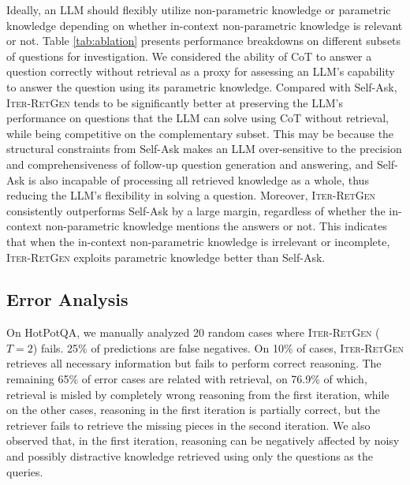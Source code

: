 \documentclass[11pt]{article}
\begin{document}
Ideally, an LLM should flexibly utilize non-parametric knowledge or parametric knowledge depending on whether in-context non-parametric knowledge is relevant or not.
Table \ref{tab:ablation} presents performance breakdowns on different subsets of questions for investigation.
We considered the ability of CoT to answer a question correctly without retrieval as a proxy for assessing an LLM's capability to answer the question using its parametric knowledge.
Compared with Self-Ask, I\textsc{ter}-R\textsc{et}G\textsc{en} tends to be significantly better at preserving the LLM's performance on questions that the LLM can solve using CoT without retrieval, while being competitive on the complementary subset.
This may be because the structural constraints from Self-Ask makes an LLM over-sensitive to the precision and comprehensiveness of follow-up question generation and answering, and Self-Ask is also incapable of processing all retrieved knowledge as a whole, thus reducing the LLM's flexibility in solving a question.
Moreover, I\textsc{ter}-R\textsc{et}G\textsc{en} consistently outperforms Self-Ask by a large margin, regardless of whether the in-context non-parametric knowledge mentions the answers or not.
This indicates that when the in-context non-parametric knowledge is irrelevant or incomplete, I\textsc{ter}-R\textsc{et}G\textsc{en} exploits parametric knowledge better than Self-Ask.

\subsection{Error Analysis}
On HotPotQA, we manually analyzed 20 random cases where I\textsc{ter}-R\textsc{et}G\textsc{en} ($T=2$) fails.
25\% of predictions are false negatives.
On 10\% of cases, I\textsc{ter}-R\textsc{et}G\textsc{en} retrieves all necessary information but fails to perform correct reasoning.
The remaining 65\% of error cases are related with retrieval, on 76.9\% of which, retrieval is misled by completely wrong reasoning from the first iteration, while on the other cases, reasoning in the first iteration is partially correct, but the retriever fails to retrieve the missing pieces in the second iteration.
We also observed that, in the first iteration, reasoning can be negatively affected by noisy and possibly distractive knowledge retrieved using only the questions as the queries.
\end{document}
